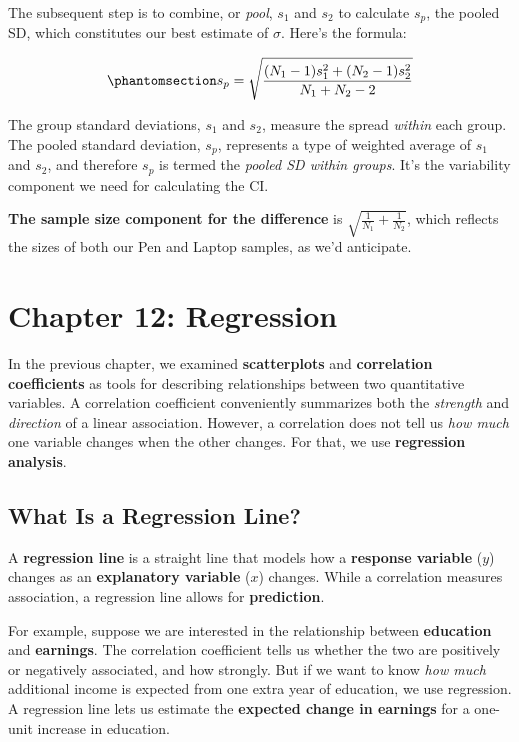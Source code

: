 \documentclass[
  letterpaper,
  DIV=11,
  numbers=noendperiod]{scrreprt}
\begin{document}
The subsequent step is to combine, or \emph{pool}, \(s_1\) and \(s_2\)
to calculate \(s_p\), the pooled SD, which constitutes our best estimate
of \(\sigma\). Here's the formula:

\begin{equation}\phantomsection\label{eq-pooled-sd}{
s_p = \sqrt{\frac{(N_1 - 1)s_1^2 + (N_2 - 1)s_2^2}{N_1 + N_2 - 2}}
}\end{equation}

The group standard deviations, \(s_1\) and \(s_2\), measure the spread
\emph{within} each group. The pooled standard deviation, \(s_p\),
represents a type of weighted average of \(s_1\) and \(s_2\), and
therefore \(s_p\) is termed the \emph{pooled SD within groups}. It's the
variability component we need for calculating the CI.

\textbf{The sample size component for the difference} is
\(\sqrt{\frac{1}{N_1} + \frac{1}{N_2}}\), which reflects the sizes of
both our Pen and Laptop samples, as we'd anticipate.


\chapter{Chapter 12: Regression}\label{chapter-12-regression}

In the previous chapter, we examined \textbf{scatterplots} and
\textbf{correlation coefficients} as tools for describing relationships
between two quantitative variables. A correlation coefficient
conveniently summarizes both the \emph{strength} and \emph{direction} of
a linear association. However, a correlation does not tell us \emph{how
much} one variable changes when the other changes. For that, we use
\textbf{regression analysis}.

\section{What Is a Regression Line?}\label{what-is-a-regression-line}

A \textbf{regression line} is a straight line that models how a
\textbf{response variable} (\(y\)) changes as an \textbf{explanatory
variable} (\(x\)) changes. While a correlation measures association, a
regression line allows for \textbf{prediction}.

For example, suppose we are interested in the relationship between
\textbf{education} and \textbf{earnings}. The correlation coefficient
tells us whether the two are positively or negatively associated, and
how strongly. But if we want to know \emph{how much} additional income
is expected from one extra year of education, we use regression. A
regression line lets us estimate the \textbf{expected change in
earnings} for a one-unit increase in education.
\end{document}
